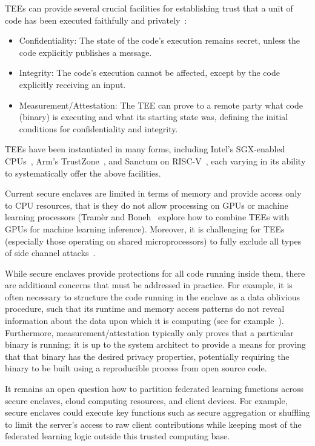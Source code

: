 \documentclass[11pt]{article}
\begin{document}
TEEs can provide several crucial facilities for establishing trust that a unit of code has been executed faithfully and privately~\cite{subramanyan2017formal}:
\begin{itemize}
\item Confidentiality: The state of the code's execution remains secret, unless the code explicitly publishes a message.
\item Integrity: The code's execution cannot be affected, except by the code explicitly receiving an input.
\item Measurement/Attestation: The TEE can prove to a remote party what code (binary) is executing and what its starting state was, defining the initial conditions for confidentiality and integrity.
\end{itemize}

TEEs have been instantiated in many forms, including Intel's SGX-enabled CPUs~\cite{intel2012architecture,costan2016intel}, Arm's TrustZone~\cite{ArmTrustzone,AndroidTrusty}, and Sanctum on RISC-V~\cite{costan2016sanctum}, each varying in its ability to systematically offer the above facilities.

Current secure enclaves are limited in terms of memory and provide access only to CPU resources, that is they do not allow processing on GPUs or machine learning processors (Tram\`er and Boneh~\cite{tramer2018slalom} explore how to combine TEEs with GPUs for machine learning inference).  Moreover, it is challenging for TEEs (especially those operating on shared microprocessors) to fully exclude all types of side channel attacks~\cite{van2018foreshadow}.

While secure enclaves provide protections for all code running inside them, there are additional concerns that must be addressed in practice.  For example, it is often necessary to structure the code running in the enclave as a data oblivious procedure, such that its runtime and memory access patterns do not reveal information about the data upon which it is computing (see for example~\cite{prochlo}).  Furthermore, measurement/attestation typically only proves that a particular binary is running; it is up to the system architect to provide a means for proving that that binary has the desired privacy properties, potentially requiring the binary to be built using a reproducible process from open source code.

It remains an open question how to partition federated learning functions across secure enclaves, cloud computing resources, and client devices. For example, secure enclaves could execute key functions such as secure aggregation or shuffling to limit the server's access to raw client contributions while keeping most of the federated learning logic outside this trusted computing base. 
\end{document}
